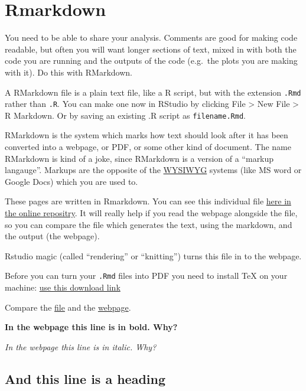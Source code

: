 \documentclass[
]{book}
\begin{document}
\hypertarget{rmarkdown}{%
\chapter{Rmarkdown}\label{rmarkdown}}

You need to be able to share your analysis. Comments are good for making code readable, but often you will want longer sections of text, mixed in with both the code you are running and the outputs of the code (e.g.~the plots you are making with it). Do this with RMarkdown.

A RMarkdown file is a plain text file, like a R script, but with the extension \texttt{.Rmd} rather than \texttt{.R}. You can make one now in RStudio by clicking File \textgreater{} New File \textgreater{} R Markdown. Or by saving an existing .R script as \texttt{filename.Rmd}.

RMarkdown is the system which marks how text should look after it has been converted into a webpage, or PDF, or some other kind of document. The name RMarkdown is kind of a joke, since RMarkdown is a version of a ``markup langauge''. Markups are the opposite of the \href{https://en.wikipedia.org/wiki/WYSIWYG}{WYSIWYG} systems (like MS word or Google Docs) which you are used to.

These pages are written in Rmarkdown. You can see this individual file \href{https://github.com/tomstafford/psy6422/blob/master/070-rmarkdown.Rmd}{here in the online repositry}. It will really help if you read the webpage alongside the file, so you can compare the file which generates the text, using the markdown, and the output (the webpage).

Rstudio magic (called ``rendering'' or ``knitting'') turns this file in to the webpage.

Before you can turn your \texttt{.Rmd} files into PDF you need to install TeX on your machine: \href{https://miktex.org/download}{use this download link}

Compare the \href{https://github.com/tomstafford/psy6422/blob/master/070-rmarkdown.Rmd}{file} and the \href{https://tomstafford.github.io/psy6422/rmarkdown.html}{webpage}.

\textbf{In the webpage this line is in bold. Why?}

\emph{In the webpage this line is in italic. Why?}

\hypertarget{and-this-line-is-a-heading}{%
\section{And this line is a heading}\label{and-this-line-is-a-heading}}
\end{document}

